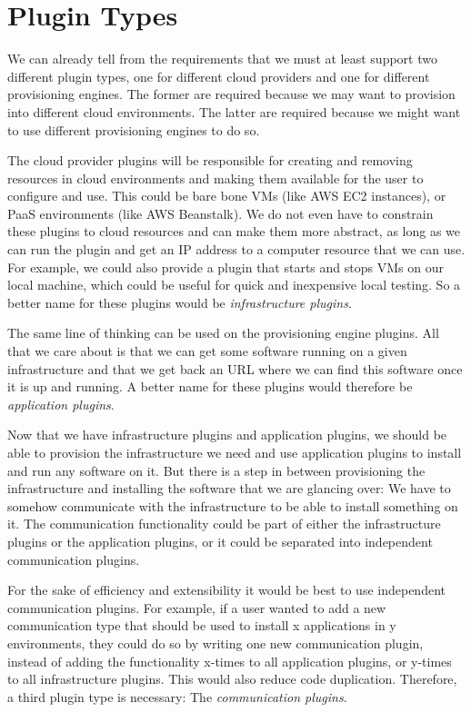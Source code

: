 \section{Plugin Types}
\label{design:plugins}

We can already tell from the requirements that we must at least support two different plugin types, one for different cloud providers and one for different provisioning engines.
The former are required because we may want to provision into different cloud environments.
The latter are required because we might want to use different provisioning engines to do so.

The cloud provider plugins will be responsible for creating and removing resources in cloud environments and making them available for the user to configure and use.
This could be bare bone VMs (like AWS EC2 instances), or PaaS environments (like AWS Beanstalk).
We do not even have to constrain these plugins to cloud resources and can make them more abstract, as long as we can run the plugin and get an IP address to a computer resource that we can use.
For example, we could also provide a plugin that starts and stops VMs on our local machine, which could be useful for quick and inexpensive local testing.
So a better name for these plugins would be \textit{infrastructure plugins}.

The same line of thinking can be used on the provisioning engine plugins.
All that we care about is that we can get some software running on a given infrastructure and that we get back an URL where we can find this software once it is up and running.
A better name for these plugins would therefore be \textit{application plugins}.

Now that we have infrastructure plugins and application plugins, we should be able to provision the infrastructure we need and use application plugins to install and run any software on it.
But there is a step in between provisioning the infrastructure and installing the software that we are glancing over: We have to somehow communicate with the infrastructure to be able to install something on it.
The communication functionality could be part of either the infrastructure plugins or the application plugins, or it could be separated into independent communication plugins.

For the sake of efficiency and extensibility it would be best to use independent communication plugins.
For example, if a user wanted to add a new communication type that should be used to install x applications in y environments, they could do so by writing one new communication plugin, instead of adding the functionality x-times to all application plugins, or y-times to all infrastructure plugins.
This would also reduce code duplication.
Therefore, a third plugin type is necessary: The \textit{communication plugins}.


